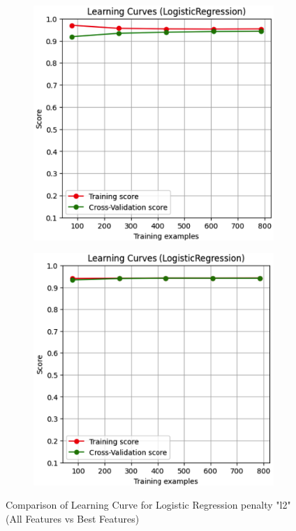 \documentclass[conference]{IEEEtran}
\begin{document}
\begin{figure}[htbp]
    \centering
    \begin{subfigure}[b]{0.45\linewidth}
        \centering
        \includegraphics[width=\linewidth]{images/LearningCurvePenaltyAllFeatures.png}
        \label{fig:learning-curve-all}
    \end{subfigure}
    \hfill
    \begin{subfigure}[b]{0.45\linewidth}
        \centering
        \includegraphics[width=\linewidth]{images/LearningCurvePenaltyBestFeatures.png}
        \label{fig:learning-curve-best}
    \end{subfigure}
    \caption{Comparison of Learning Curve for Logistic Regression penalty "l2" (All Features vs Best Features)}
    \label{fig:learning-curve-comparison}
\end{figure}
\end{document}
